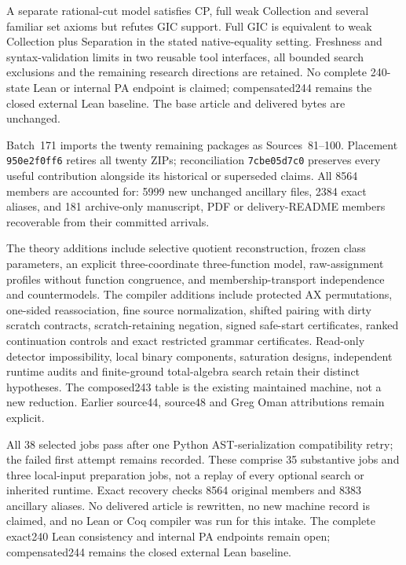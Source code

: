 \documentclass[11pt]{article}
\begin{document}
{A separate rational-cut model satisfies CP, full weak Collection and
several familiar set axioms but refutes GIC support. Full GIC is equivalent
to weak Collection plus Separation in the stated native-equality setting.
Freshness and syntax-validation limits in two reusable tool interfaces,
all bounded search exclusions and the remaining research directions are
retained. No complete 240-state Lean or internal PA endpoint is claimed;
compensated244 remains the closed external Lean baseline. The base article
and delivered bytes are unchanged.


Batch~171 imports the twenty remaining packages as Sources~81--100.
Placement \texttt{950e2f0ff6} retires all twenty ZIPs; reconciliation
\texttt{7cbe05d7c0} preserves every useful contribution alongside its historical
or superseded claims. All 8564 members are accounted for: 5999 new unchanged
ancillary files, 2384 exact aliases, and 181 archive-only manuscript, PDF or
delivery-README members recoverable from their committed arrivals.

The theory additions include selective quotient reconstruction, frozen class
parameters, an explicit three-coordinate three-function model, raw-assignment
profiles without function congruence, and membership-transport independence
and countermodels. The compiler additions include protected AX permutations,
one-sided reassociation, fine source normalization, shifted pairing with dirty
scratch contracts, scratch-retaining negation, signed safe-start certificates,
ranked continuation controls and exact restricted grammar certificates.
Read-only detector impossibility, local binary components, saturation designs,
independent runtime audits and finite-ground total-algebra search retain their
distinct hypotheses. The composed243 table is the existing maintained machine,
not a new reduction. Earlier source44, source48 and Greg Oman attributions
remain explicit.

All 38 selected jobs pass after one Python AST-serialization compatibility
retry; the failed first attempt remains recorded. These comprise 35 substantive
jobs and three local-input preparation jobs, not a replay of every optional
search or inherited runtime. Exact recovery checks 8564 original members and
8383 ancillary aliases. No delivered article is rewritten, no new machine
record is claimed, and no Lean or Coq compiler was run for this intake. The
complete exact240 Lean consistency and internal PA endpoints remain open;
compensated244 remains the closed external Lean baseline.

}
\end{document}
